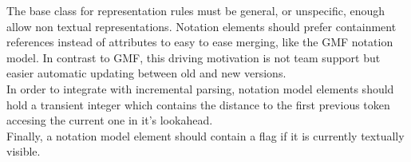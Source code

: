 The base class for representation rules must be general, or unspecific, enough allow non textual representations. Notation elements should prefer containment references instead of attributes to easy to ease merging, like the GMF notation model. In contrast to GMF, this driving motivation is not team support but easier automatic updating between old and new versions.\\
In order to integrate with incremental parsing, notation model elements should hold a transient integer which contains the distance to the first previous token accesing the current one in it's lookahead. \\
Finally, a notation model element should contain a flag if it is currently textually visible.


